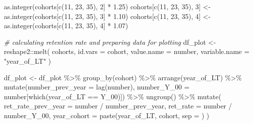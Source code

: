 \documentclass[
]{book}
\newenvironment{Shaded}{\begin{snugshade}}{\end{snugshade}}
\newcommand{\AttributeTok}[1]{\textcolor[rgb]{0.77,0.63,0.00}{#1}}
\newcommand{\CommentTok}[1]{\textcolor[rgb]{0.56,0.35,0.01}{\textit{#1}}}
\newcommand{\DecValTok}[1]{\textcolor[rgb]{0.00,0.00,0.81}{#1}}
\newcommand{\FloatTok}[1]{\textcolor[rgb]{0.00,0.00,0.81}{#1}}
\newcommand{\FunctionTok}[1]{\textcolor[rgb]{0.00,0.00,0.00}{#1}}
\newcommand{\NormalTok}[1]{#1}
\newcommand{\OtherTok}[1]{\textcolor[rgb]{0.56,0.35,0.01}{#1}}
\newcommand{\SpecialCharTok}[1]{\textcolor[rgb]{0.00,0.00,0.00}{#1}}
\newcommand{\StringTok}[1]{\textcolor[rgb]{0.31,0.60,0.02}{#1}}
\begin{document}
\begin{Shaded}
\begin{Highlighting}[]
    \FunctionTok{as.integer}\NormalTok{(cohorts[}\FunctionTok{c}\NormalTok{(}\DecValTok{11}\NormalTok{, }\DecValTok{23}\NormalTok{, }\DecValTok{35}\NormalTok{), }\DecValTok{2}\NormalTok{] }\SpecialCharTok{*} \FloatTok{1.25}\NormalTok{)}
\NormalTok{cohorts[}\FunctionTok{c}\NormalTok{(}\DecValTok{11}\NormalTok{, }\DecValTok{23}\NormalTok{, }\DecValTok{35}\NormalTok{), }\DecValTok{3}\NormalTok{] }\OtherTok{\textless{}{-}}
    \FunctionTok{as.integer}\NormalTok{(cohorts[}\FunctionTok{c}\NormalTok{(}\DecValTok{11}\NormalTok{, }\DecValTok{23}\NormalTok{, }\DecValTok{35}\NormalTok{), }\DecValTok{3}\NormalTok{] }\SpecialCharTok{*} \FloatTok{1.10}\NormalTok{)}
\NormalTok{cohorts[}\FunctionTok{c}\NormalTok{(}\DecValTok{11}\NormalTok{, }\DecValTok{23}\NormalTok{, }\DecValTok{35}\NormalTok{), }\DecValTok{4}\NormalTok{] }\OtherTok{\textless{}{-}}
    \FunctionTok{as.integer}\NormalTok{(cohorts[}\FunctionTok{c}\NormalTok{(}\DecValTok{11}\NormalTok{, }\DecValTok{23}\NormalTok{, }\DecValTok{35}\NormalTok{), }\DecValTok{4}\NormalTok{] }\SpecialCharTok{*} \FloatTok{1.07}\NormalTok{)}

\CommentTok{\# calculating retention rate and preparing data for plotting}
\NormalTok{df\_plot }\OtherTok{\textless{}{-}}
\NormalTok{    reshape2}\SpecialCharTok{::}\FunctionTok{melt}\NormalTok{(}
\NormalTok{        cohorts,}
        \AttributeTok{id.vars =} \StringTok{\textquotesingle{}cohort\textquotesingle{}}\NormalTok{,}
        \AttributeTok{value.name =} \StringTok{\textquotesingle{}number\textquotesingle{}}\NormalTok{,}
        \AttributeTok{variable.name =} \StringTok{"year\_of\_LT"}
\NormalTok{    )}

\NormalTok{df\_plot }\OtherTok{\textless{}{-}}\NormalTok{ df\_plot }\SpecialCharTok{\%\textgreater{}\%}
    \FunctionTok{group\_by}\NormalTok{(cohort) }\SpecialCharTok{\%\textgreater{}\%}
    \FunctionTok{arrange}\NormalTok{(year\_of\_LT) }\SpecialCharTok{\%\textgreater{}\%}
    \FunctionTok{mutate}\NormalTok{(}\AttributeTok{number\_prev\_year =} \FunctionTok{lag}\NormalTok{(number),}
           \AttributeTok{number\_Y\_00 =}\NormalTok{ number[}\FunctionTok{which}\NormalTok{(year\_of\_LT }\SpecialCharTok{==} \StringTok{\textquotesingle{}Y\_00\textquotesingle{}}\NormalTok{)]) }\SpecialCharTok{\%\textgreater{}\%}
    \FunctionTok{ungroup}\NormalTok{() }\SpecialCharTok{\%\textgreater{}\%}
    \FunctionTok{mutate}\NormalTok{(}
        \AttributeTok{ret\_rate\_prev\_year =}\NormalTok{ number }\SpecialCharTok{/}\NormalTok{ number\_prev\_year,}
        \AttributeTok{ret\_rate =}\NormalTok{ number }\SpecialCharTok{/}\NormalTok{ number\_Y\_00,}
        \AttributeTok{year\_cohort =} \FunctionTok{paste}\NormalTok{(year\_of\_LT, cohort, }\AttributeTok{sep =} \StringTok{\textquotesingle{}{-}\textquotesingle{}}\NormalTok{)}
\NormalTok{    )}


\end{Highlighting}
\end{Shaded}
\end{document}
